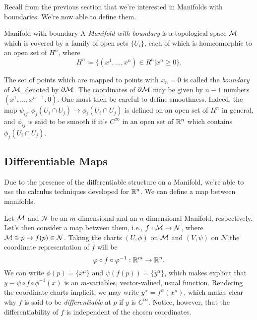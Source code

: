 Recall from the previous section that we're interested in Manifolds with boundaries. We're now able to define them.
\begin{definition}{Manifold with boundary}
    A \emph{Manifold with boundary} is a topological space $\mathcal{M}$ which is covered by a family of open sets $\{U_i\}$, each of which is homeomorphic to an open set of $H^n$, where
    \begin{equation}
        H^n \coloneq \{ (x^1, \dots, x^n) \in R^n | x^n \geq 0 \} .
    \end{equation} 
\end{definition}

The set of points which are mapped to points with $x_n = 0$ is called the \emph{boundary} of $\mathcal{M}$, denoted by $\partial \mathcal{M}$. The coordinates of $\partial \mathcal{M}$ may be given by $n-1$ numbers $(x^1, \dots, x^{n-1},0)$. One must then be careful to define smoothness. Indeed, the map $\psi_{ij} \colon \phi_j (U_i \cap U_j) \to \phi_i(U_i \cap U_j)$ is defined on an open set of $H^n$ in general, and $\phi_{ij}$ is said to be smooth if it's $C^\infty$ in an open set of $\mathbb{R}^n$ which contains $\phi_j(U_i \cap U_j)$.

\subsection{Differentiable Maps}
Due to the presence of the differentiable structure on a Manifold, we're able to use the calculus techniques developed for $\mathbb{R}^n$. We can define a map between manifolds.

Let $\mathcal{M}$ and $\mathcal{N}$  be an $m$-dimensional and an $n$-dimensional Manifold, respectively. Let's then consider a map between them, i.e., $f: \mathcal{M} \to \mathcal{N}$, where $\mathcal{M} \ni p \mapsto f(p) \in \mathcal{N}$. Taking the charts $(U, \phi)$ on $\mathcal{M}$ and $(V,\psi)$ on $\mathcal{N}$,the coordinate representation of $f$ will be
\begin{equation}
    \varphi \circ f \circ \varphi^{-1}: \mathbb{R}^m \to \mathbb{R}^n .
\end{equation}
We can write $\phi(p) = \{x^\mu\}$ and $\psi(f(p)) = \{y^\alpha\}$, which makes explicit that $y \equiv \psi \circ f \circ \phi^{-1}(x)$ is an $m$-variables, vector-valued, usual function. Rendering the coordinate charts implicit, we may write $y^\alpha = f^\alpha(x^\mu)$, which makes clear why $f$ is said to be \emph{differentiable} at $p$ if $y$ is $C^\infty$. Notice, however, that the differentiability of $f$ is independent of the chosen coordinates.

